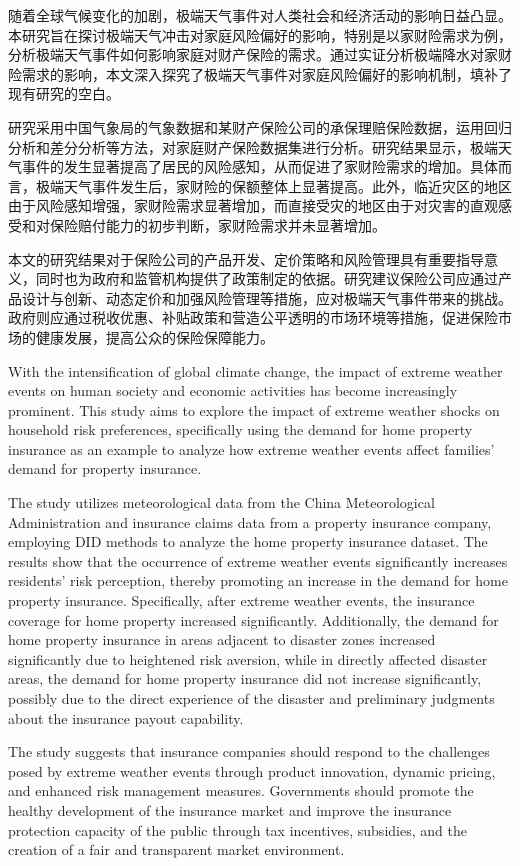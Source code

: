 \begin{cabstract}

    随着全球气候变化的加剧，极端天气事件对人类社会和经济活动的影响日益凸显。本研究旨在探讨极端天气冲击对家庭风险偏好的影响，特别是以家财险需求为例，分析极端天气事件如何影响家庭对财产保险的需求。通过实证分析极端降水对家财险需求的影响，本文深入探究了极端天气事件对家庭风险偏好的影响机制，填补了现有研究的空白。

    研究采用中国气象局的气象数据和某财产保险公司的承保理赔保险数据，运用回归分析和差分分析等方法，对家庭财产保险数据集进行分析。研究结果显示，极端天气事件的发生显著提高了居民的风险感知，从而促进了家财险需求的增加。具体而言，极端天气事件发生后，家财险的保额整体上显著提高。此外，临近灾区的地区由于风险感知增强，家财险需求显著增加，而直接受灾的地区由于对灾害的直观感受和对保险赔付能力的初步判断，家财险需求并未显著增加。

    本文的研究结果对于保险公司的产品开发、定价策略和风险管理具有重要指导意义，同时也为政府和监管机构提供了政策制定的依据。研究建议保险公司应通过产品设计与创新、动态定价和加强风险管理等措施，应对极端天气事件带来的挑战。政府则应通过税收优惠、补贴政策和营造公平透明的市场环境等措施，促进保险市场的健康发展，提高公众的保险保障能力。

\end{cabstract}
\begin{eabstract}
With the intensification of global climate change, the impact of extreme weather events on human society and economic activities has become increasingly prominent. This study aims to explore the impact of extreme weather shocks on household risk preferences, specifically using the demand for home property insurance as an example to analyze how extreme weather events affect families' demand for property insurance.

The study utilizes meteorological data from the China Meteorological Administration and insurance claims data from a property insurance company, employing DID methods to analyze the home property insurance dataset. The results show that the occurrence of extreme weather events significantly increases residents' risk perception, thereby promoting an increase in the demand for home property insurance. Specifically, after extreme weather events, the insurance coverage for home property increased significantly. Additionally, the demand for home property insurance in areas adjacent to disaster zones increased significantly due to heightened risk aversion, while in directly affected disaster areas, the demand for home property insurance did not increase significantly, possibly due to the direct experience of the disaster and preliminary judgments about the insurance payout capability.

The study suggests that insurance companies should respond to the challenges posed by extreme weather events through product innovation, dynamic pricing, and enhanced risk management measures. Governments should promote the healthy development of the insurance market and improve the insurance protection capacity of the public through tax incentives, subsidies, and the creation of a fair and transparent market environment.

\end{eabstract}
